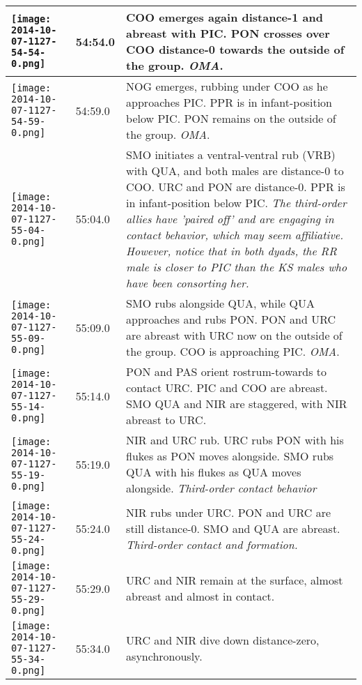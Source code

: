 \documentclass[11pt]{amsart}
\begin{document}
\begin{longtable}{| m{} | m{} | m{} |}
\texttt{[image: 2014-10-07-1127-54-54-0.png]} & 54:54.0 &  COO emerges again distance-1 and abreast with PIC. PON crosses over COO distance-0 towards the outside of the group. \textit{OMA}. \\ \hline
\texttt{[image: 2014-10-07-1127-54-59-0.png]} & 54:59.0 &  NOG emerges, rubbing under COO as he approaches PIC. PPR is in infant-position below PIC. PON remains on the outside of the group. \textit{OMA}. \\ \hline
\texttt{[image: 2014-10-07-1127-55-04-0.png]} & 55:04.0 & SMO initiates a ventral-ventral rub (VRB) with QUA, and both males are distance-0 to COO. URC and PON are distance-0. PPR is in infant-position below PIC. \textit{The third-order allies have 'paired off' and are engaging in contact behavior, which may seem affiliative. However, notice that in both dyads, the RR male is closer to PIC than the KS males who have been consorting her. }\\ \hline
\texttt{[image: 2014-10-07-1127-55-09-0.png]} & 55:09.0 &  SMO rubs alongside QUA, while QUA approaches and rubs PON. PON and URC are abreast with URC now on the outside of the group. COO is approaching PIC. \textit{OMA}. \\ \hline
\texttt{[image: 2014-10-07-1127-55-14-0.png]} & 55:14.0 & PON and PAS orient rostrum-towards to contact URC. PIC and COO are abreast.  SMO QUA and NIR are staggered, with NIR abreast to URC. \\ \hline %
\texttt{[image: 2014-10-07-1127-55-19-0.png]} & 55:19.0 & NIR and URC rub. URC rubs PON with his flukes as PON moves alongside. SMO rubs QUA with his flukes as QUA moves alongside. \textit{Third-order contact behavior} \\ \hline
\texttt{[image: 2014-10-07-1127-55-24-0.png]} & 55:24.0 & NIR rubs under URC.  PON and URC are still distance-0. SMO and QUA are abreast. \textit{Third-order contact and formation.} \\ \hline
\texttt{[image: 2014-10-07-1127-55-29-0.png]} & 55:29.0 & URC and NIR remain at the surface, almost abreast and almost in contact. \\ \hline
\texttt{[image: 2014-10-07-1127-55-34-0.png]} & 55:34.0 & URC and NIR dive down distance-zero, asynchronously.  \\ \hline
\end{longtable}
\end{document}
